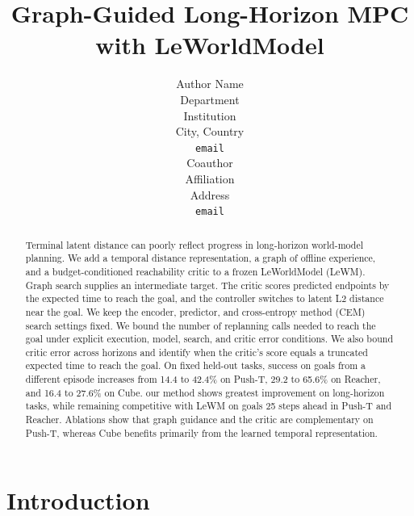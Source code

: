 \documentclass{article} %
\title{Graph-Guided Long-Horizon MPC with LeWorldModel}
\author{Author Name \\
Department \\
Institution \\
City, Country \\
\texttt{email} \\
\And
Coauthor \\
Affiliation \\
Address \\
\texttt{email}
}
\theoremstyle{definition}
\theoremstyle{remark}
\newcommand{\keypoints}[1]{\par\medskip\noindent\fcolorbox{black!50}{black!5}{\begin{minipage}{0.96\linewidth}\small
\textbf{Key points this section must land.}\begin{itemize}[nosep,leftmargin=1.2em]#1\end{itemize}\end{minipage}}\par\medskip}
\begin{document}
\maketitle

\begin{abstract}
Terminal latent distance can poorly reflect progress in long-horizon world-model
planning. We add a temporal distance representation, a graph of offline experience,
and a budget-conditioned reachability critic to a frozen LeWorldModel (LeWM).
Graph search supplies an intermediate target. The critic scores predicted endpoints
by the expected time to reach the goal, and the controller switches to latent L2 distance near the goal.
We keep the encoder, predictor, and cross-entropy method (CEM) search settings fixed.
We bound the number of replanning calls needed to reach the goal under explicit
execution, model, search, and critic error conditions. We also bound critic error across horizons and identify when the critic's score equals a truncated expected time to reach the goal.
On fixed held-out tasks, success on goals from a different episode increases from 14.4 to 42.4\% on Push-T,
29.2 to 65.6\% on Reacher, and 16.4 to 27.6\% on Cube. our method shows greatest improvement on long-horizon tasks, while remaining competitive with
LeWM on goals 25 steps ahead in Push-T and Reacher. Ablations show that
graph guidance and the critic are complementary on Push-T, whereas Cube benefits primarily
from the learned temporal representation.
\end{abstract}

\section{Introduction}
\end{document}
